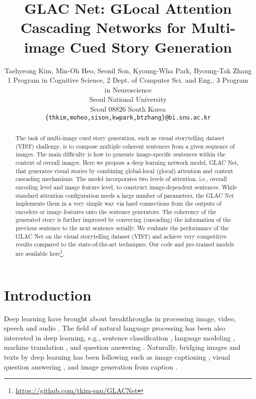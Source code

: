 \documentclass[11pt,a4paper]{article}
\title{GLAC Net: GLocal Attention Cascading Networks for Multi-image Cued Story Generation}
\author{Taehyeong Kim, Min-Oh Heo, Seonil Son, Kyoung-Wha Park, Byoung-Tak Zhang  \\
  1 Program in Cognitive Science, 2 Dept. of Computer Sci. and Eng., 3 Program in Neuroscience\\
  Seoul National University \\
  Seoul 08826  South Korea \\
  {\tt  \{thkim,moheo,sison,kwpark,btzhang\}@bi.snu.ac.kr} \\}
\date{}
\begin{document}
\maketitle
\begin{abstract}
The task of multi-image cued story generation, such as visual storytelling dataset (VIST) challenge, is to compose multiple coherent sentences from a given sequence of images. 
The main difficulty is how to generate image-specific sentences within the context of overall images. 
Here we propose a deep learning network model, GLAC Net, that generates visual stories by combining global-local (glocal) attention and context cascading mechanisms. 
The model incorporates two levels of attention, i.e., overall encoding level and image feature level, to construct image-dependent sentences.
While standard attention configuration needs a large number of parameters, the GLAC Net implements them in a very simple way via hard connections from the outputs of encoders or image features onto the sentence generators. 
The coherency of the generated story is further improved by conveying (cascading) the information of the previous sentence to the next sentence serially. 
We evaluate the performance of the GLAC Net on the visual storytelling dataset (VIST) and achieve very competitive results compared to the state-of-the-art techniques. Our code and pre-trained models are available here\footnote{\url{https://github.com/tkim-snu/GLACNet}}.



\end{abstract}

\section{Introduction} 



Deep learning have brought about breakthroughs in processing image, video, speech and audio \cite{lecun2015deep}.
The field of natural language processing has been also interested in deep learning, e.g., sentence classification \cite{kim2014convolutional,iyyer2015deep}, language modeling \cite{bengio2003neural,mikolov2013distributed}, machine translation \cite{sutskever2014sequence,Bah2014nmt,wu2016google}, and question answering \cite{hermann2015teaching}.
Naturally, bridging images and texts by deep learning has been following \cite{belz20018from} such as image captioning \cite{vinyals2015show,xu2015showattend,Karpathy2017dva}, visual question answering \cite{antol2015vqa,kim2016multimodal}, and image generation from caption \cite{reed2016generative,zhang2017stackgan}.
\end{document}
